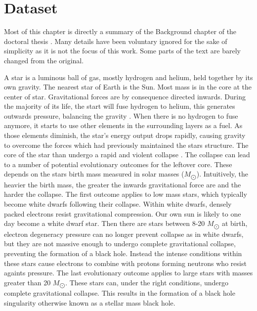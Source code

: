 \chapter{Dataset}\label{chapter-dataset} 

Most of this chapter is directly a summary of the Background chapter of the doctoral thesis \citep{lyon}. Many details have been voluntary ignored for the sake of simplicity as it is not the focus of this work. Some parts of the text are barely changed from the original.

A star is a luminous ball of gas, mostly hydrogen and helium, held together by its own gravity. The nearest star of Earth is the Sun. Most mass is in the core at the center of star. Gravitational forces are by consequence directed inwards. During the majority of its life, the start will fuse hydrogen to helium, this generates outwards pressure, balancing the gravity \citep{ghosh}. When there is no hydrogen to fuse anymore, it starts to use other elements in the surrounding layers as a fuel. As those elements diminish, the star's energy output drops rapidly, causing gravity to overcome the forces which had previously maintained the stars structure. The core of the star than undergo a rapid and violent collapse \citep{ghosh}. The collapse can lead to a number of potential evolutionary outcomes for the leftover core. These depends on the stars birth mass measured in solar masses ($M_{\bigodot}$). Intuitively, the heavier the birth mass, the greater the inwards gravitational force are and the harder the collapse. The first outcome applies to low mass stars, which typically become white dwarfs following their collapse. Within white dwarfs, densely packed electrons resist gravitational compression. Our own sun is likely to one day become a white dwarf star. Then there are stars between 8-20 $M_{\bigodot}$ at birth, electron degeneracy pressure can no longer prevent collapse as in white dwarfs, but they are not massive enough to undergo complete gravitational collapse, preventing the formation of a black hole. Instead the intense conditions within these stars cause electrons to combine with protons forming neutrons who resist againts pressure. The last evolutionary outcome applies to large stars with masses greater than 20 $M_{\bigodot}$. These stars can, under the right conditions, undergo complete gravitational collapse. This results in the formation of a black hole singularity otherwise known as a stellar mass black hole. 
